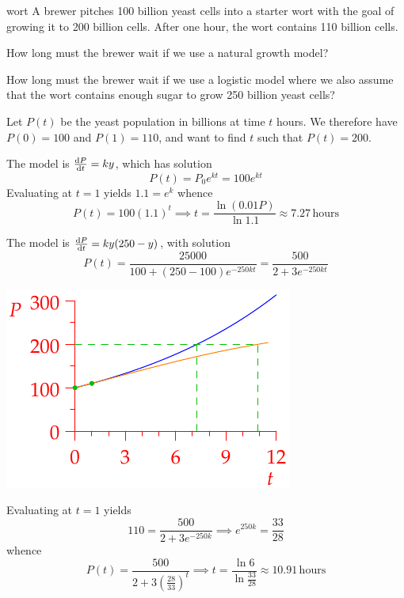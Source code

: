 \begin{example}{}{wort}
	A brewer pitches 100 billion yeast cells into a starter wort with the goal of growing it to 200 billion cells. After one hour, the wort contains 110 billion cells.
	\begin{enumeratea}
	  \item How long must the brewer wait if we use a natural growth model?
	  \item How long must the brewer wait if we use a logistic model where we also assume that the wort contains enough sugar to grow 250 billion yeast cells?
	\end{enumeratea}
	
	Let $P(t)$ be the yeast population in billions at time $t$ hours. We therefore have $P(0)=100$ and $P(1)=110$, and want to find $t$ such that $P(t)=200$.
	\begin{enumeratea}
	  \begin{minipage}[t]{0.6\linewidth}\vspace{0pt}
	  	\item The model is $\diff[P]{t}=ky$, which has solution
	  	\[
	  		P(t)=P_0e^{kt}=100e^{kt}
	  	\]
	  	Evaluating at $t=1$ yields $1.1=e^k$ whence
	  	\[
	  		P(t)=100(1.1)^t\implies t=\frac{\ln(0.01 P)}{\ln 1.1}\approx 7.27\,\text{hours}
	  	\]
			\item The model is $\diff[P]{t}=ky(250-y)$, with solution
			\[
				P(t)=\frac{25000}{100+(250-100)e^{-250kt}} =\frac{500}{2+3e^{-250kt}}
			\]
	  \end{minipage}
	  \hfill
	  \begin{minipage}[t]{0.39\linewidth}\vspace{0pt}
	  	\flushright\includegraphics{wort}
	  \end{minipage}\smallbreak
	  
		Evaluating at $t=1$ yields
		\[
			110=\frac{500}{2+3e^{-250k}} \implies e^{250k}=\frac{33}{28}
		\]
		whence
		\[
			P(t)=\frac{500}{2+3\left(\frac{28}{33}\right)^t}
			\implies t=\frac{\ln 6}{\ln\frac{33}{28}} \approx 10.91\,\text{hours}
		\]
  \end{enumeratea}
\end{example}


